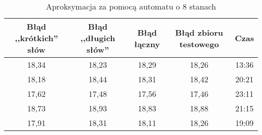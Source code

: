 \documentclass{../llncs_template_final/llncs}
\begin{document}
\begin{table}[] 
\centering 
\caption{Aproksymacja za pomocą automatu o 8 stanach} 
\begin{tabular}{| c | c | c | c | c |} 
\hline Błąd ,,krótkich'' słów & Błąd ,,długich słów'' & Błąd łączny & Błąd zbioru testowego & Czas \\ [0.5ex] 
\hline 18,34 & 18,23 & 18,29 & 18,26 & 13:36 \\ 
\hline 18,18 & 18,44 & 18,31 & 18,42 & 20:21 \\ 
\hline 17,62 & 17,48 & 17,56 & 17,46 & 23:11 \\ 
\hline 18,73 & 18,93 & 18,83 & 18,88 & 21:15 \\ 
\hline 17,91 & 18,31 & 18,11 & 18,26 & 19:09 \\ 
\hline 
\end{tabular} 
\end{table}
\end{document}
